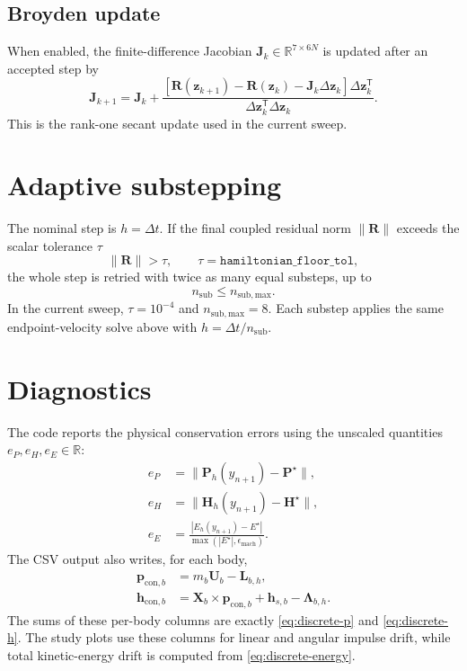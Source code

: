 \documentclass[11pt,a4paper]{article}
\newcommand{\R}{\mathbb{R}}
\newcommand{\bX}{\bm{X}}
\newcommand{\bU}{\bm{U}}
\newcommand{\bL}{\bm{L}}
\newcommand{\bLam}{\bm{\Lambda}}
\newcommand{\bp}{\bm{p}}
\newcommand{\bh}{\bm{h}}
\newcommand{\bP}{\bm{P}}
\newcommand{\bH}{\bm{H}}
\newcommand{\bR}{\bm{R}}
\newcommand{\bz}{\bm{z}}
\newcommand{\bJ}{\bm{J}}
\begin{document}
\subsection{Broyden update}

When enabled, the finite-difference Jacobian $\bJ_k\in\R^{7\times 6N}$ is
updated after an accepted step
by
\begin{equation}
  \bJ_{k+1}
  =
  \bJ_k
  +
  \frac{
    \left[
      \bR(\bz_{k+1})-\bR(\bz_k)-\bJ_k\Delta\bz_k
    \right]
    \Delta\bz_k^\mathsf{T}
  }{
    \Delta\bz_k^\mathsf{T}\Delta\bz_k
  }.
  \label{eq:broyden}
\end{equation}
This is the rank-one secant update used in the current sweep.

\section{Adaptive substepping}

The nominal step is $h=\Delta t$.  If the final coupled residual norm
$\|\bR\|$ exceeds the scalar tolerance $\tau$
\begin{equation}
  \|\bR\| > \tau,
  \qquad \tau=\texttt{hamiltonian\_floor\_tol},
  \label{eq:adaptive-test}
\end{equation}
the whole step is retried with twice as many equal substeps, up to
\begin{equation}
  n_{\mathrm{sub}}\le n_{\mathrm{sub,max}}.
  \label{eq:max-substeps}
\end{equation}
In the current sweep, $\tau=10^{-4}$ and $n_{\mathrm{sub,max}}=8$.  Each
substep applies the same endpoint-velocity solve above with $h=\Delta
t/n_{\mathrm{sub}}$.

\section{Diagnostics}

The code reports the physical conservation errors using the unscaled quantities
$e_P,e_H,e_E\in\R$:
\begin{align}
  e_P &= \|\bP_h(y_{n+1})-\bP^\star\|,\\
  e_H &= \|\bH_h(y_{n+1})-\bH^\star\|,\\
  e_E &= \frac{|E_h(y_{n+1})-E^\star|}{\max(|E^\star|,\epsilon_{\mathrm{mach}})} .
\end{align}
The CSV output also writes, for each body,
\begin{align}
  \bp_{\mathrm{con},b}
  &=m_b\bU_b-\bL_{b,h},\\
  \bh_{\mathrm{con},b}
  &=
  \bX_b\times\bp_{\mathrm{con},b}
  +\bh_{s,b}
  -\bLam_{b,h}.
\end{align}
The sums of these per-body columns are exactly
\eqref{eq:discrete-p} and \eqref{eq:discrete-h}.  The study plots use these
columns for linear and angular impulse drift, while total kinetic-energy drift
is computed from \eqref{eq:discrete-energy}.
\end{document}
